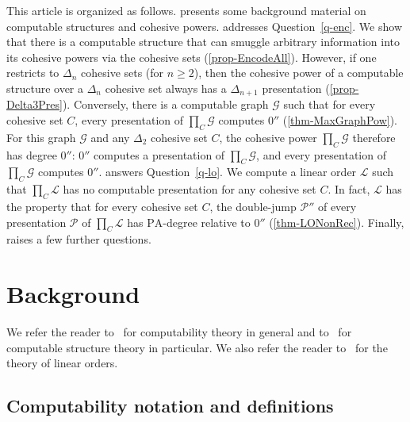 \documentclass[11pt,a4paper,reqno]{amsart}
\theoremstyle{definition}
\newcommand{\pa}{\mathrm{PA}}
\newcommand{\mc}[1]{\mathcal{#1}}
\begin{document}
This article is organized as follows.   presents some background material on computable structures and cohesive powers.   addresses Question~\ref{q-enc}.  We show that there is a computable structure that can smuggle arbitrary information into its cohesive powers via the cohesive sets (\cref{prop-EncodeAll}).  However, if one restricts to $\Delta_n$ cohesive sets (for $n \geq 2$), then the cohesive power of a computable structure over a $\Delta_n$ cohesive set always has a $\Delta_{n+1}$ presentation (\cref{prop-Delta3Pres}).  Conversely, there is a computable graph $\mc{G}$ such that for every cohesive set $C$, every presentation of $\prod_C \mc{G}$ computes $0''$ (\cref{thm-MaxGraphPow}).  For this graph $\mc{G}$ and any $\Delta_2$ cohesive set $C$, the cohesive power $\prod_C \mc{G}$ therefore has degree $0''$:  $0''$ computes a presentation of $\prod_C \mc{G}$, and every presentation of $\prod_C \mc{G}$ computes $0''$.   answers Question~\ref{q-lo}.  We compute a linear order $\mc{L}$ such that $\prod_C \mc{L}$ has no computable presentation for any cohesive set $C$.  In fact, $\mc{L}$ has the property that for every cohesive set $C$, the double-jump $\mc{P}''$ of every presentation $\mc{P}$ of $\prod_C \mc{L}$ has $\pa$-degree relative to $0''$ (\cref{thm-LONonRec}).  Finally,  raises a few further questions.


\section{Background}\label{sec-bak}

We refer the reader to~\cites{LermanBook,SoareBookRE} for computability theory in general and to~\cites{AshKnightBook,MontalbanBookWithin,MontalbanBookBeyond} for computable structure theory in particular.  We also refer the reader to~\cite{RosBook} for the theory of linear orders.

\subsection*{Computability notation and definitions}
\end{document}
